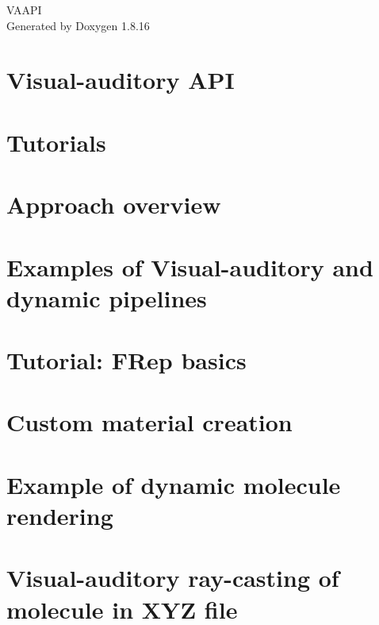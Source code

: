 \let\mypdfximage\pdfximage\def\pdfximage{\immediate\mypdfximage}\documentclass[twoside]{book}
\newcommand{\+}{\discretionary{\mbox{\scriptsize$\hookleftarrow$}}{}{}}
\newcommand{\clearemptydoublepage}{%
  \newpage{\pagestyle{empty}\cleardoublepage}%
}
\begin{document}
\begin{titlepage}
\vspace*{7cm}
\begin{center}%
{\Large V\+A\+A\+PI }\\
\vspace*{1cm}
{\large Generated by Doxygen 1.8.16}\\
\end{center}
\end{titlepage}
\clearemptydoublepage
{}
\tableofcontents
\clearemptydoublepage
{}

\chapter{Visual-\/auditory A\+PI}
\label{index}
\chapter{Tutorials}
\label{md_doc_alltutorials}

\chapter{Approach overview}
\label{md_doc_approach}

\chapter{Examples of Visual-\/auditory and dynamic pipelines}
\label{md_doc_examples}

\chapter{Tutorial\+: F\+Rep basics}
\label{md_doc_freptutorial}

\chapter{Custom material creation}
\label{md_doc_materialtutorial}

\chapter{Example of dynamic molecule rendering}
\label{md_doc_molecule_pipeline}

\chapter{Visual-\/auditory ray-\/casting of molecule in X\+YZ file}
\label{md_doc_va_molecule_raycast}

\end{document}
